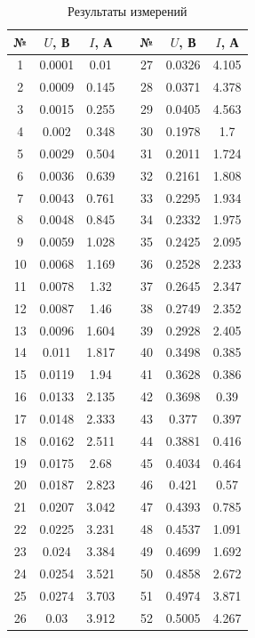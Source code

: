 \documentclass[12pt]{kiarticle} %
\begin{document}
	\begin{table}[h]
		\caption{Результаты измерений}
		\begin{center}
			\begin{tabular}{|c|c|c|c|c|c|c|}
				\hline
				№ & $ U $, В & $ I $, А &  & № & $ U $, В & $ I $, А  \\
				\hline
			 1 & 0.0001 & 0.01 & \text{} & 27 & 0.0326 & 4.105 \\
			2 & 0.0009 & 0.145 & \text{} & 28 & 0.0371 & 4.378 \\
			3 & 0.0015 & 0.255 & \text{} & 29 & 0.0405 & 4.563 \\
			4 & 0.002 & 0.348 & \text{} & 30 & 0.1978 & 1.7 \\
			5 & 0.0029 & 0.504 & \text{} & 31 & 0.2011 & 1.724 \\
			6 & 0.0036 & 0.639 & \text{} & 32 & 0.2161 & 1.808 \\
			7 & 0.0043 & 0.761 & \text{} & 33 & 0.2295 & 1.934 \\
			8 & 0.0048 & 0.845 & \text{} & 34 & 0.2332 & 1.975 \\
			9 & 0.0059 & 1.028 & \text{} & 35 & 0.2425 & 2.095 \\
			10 & 0.0068 & 1.169 & \text{} & 36 & 0.2528 & 2.233 \\
			11 & 0.0078 & 1.32 & \text{} & 37 & 0.2645 & 2.347 \\
			12 & 0.0087 & 1.46 & \text{} & 38 & 0.2749 & 2.352 \\
			13 & 0.0096 & 1.604 & \text{} & 39 & 0.2928 & 2.405 \\
			14 & 0.011 & 1.817 & \text{} & 40 & 0.3498 & 0.385 \\
			15 & 0.0119 & 1.94 & \text{} & 41 & 0.3628 & 0.386 \\
			16 & 0.0133 & 2.135 & \text{} & 42 & 0.3698 & 0.39 \\
			17 & 0.0148 & 2.333 & \text{} & 43 & 0.377 & 0.397 \\
			18 & 0.0162 & 2.511 & \text{} & 44 & 0.3881 & 0.416 \\
			19 & 0.0175 & 2.68 & \text{} & 45 & 0.4034 & 0.464 \\
			20 & 0.0187 & 2.823 & \text{} & 46 & 0.421 & 0.57 \\
			21 & 0.0207 & 3.042 & \text{} & 47 & 0.4393 & 0.785 \\
			22 & 0.0225 & 3.231 & \text{} & 48 & 0.4537 & 1.091 \\
			23 & 0.024 & 3.384 & \text{} & 49 & 0.4699 & 1.692 \\
			24 & 0.0254 & 3.521 & \text{} & 50 & 0.4858 & 2.672 \\
			25 & 0.0274 & 3.703 & \text{} & 51 & 0.4974 & 3.871 \\
			26 & 0.03 & 3.912 & \text{} & 52 & 0.5005 & 4.267 \\
				\hline
			\end{tabular}
		\end{center}
		\label{table_5}
	\end{table}
\end{document}
